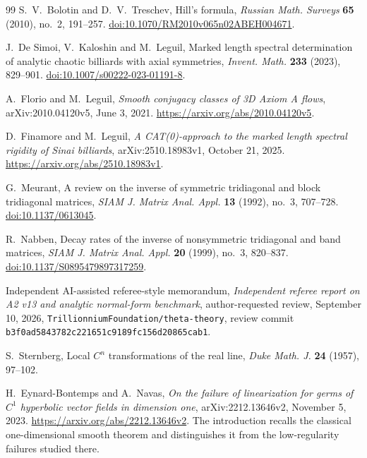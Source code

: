 \begin{thebibliography}{99}
S.~V.~Bolotin and D.~V.~Treschev, Hill's formula,
\emph{Russian Math. Surveys} \textbf{65} (2010), no.~2, 191--257.
\href{https://doi.org/10.1070/RM2010v065n02ABEH004671}{doi:10.1070/RM2010v065n02ABEH004671}.

J.~De Simoi, V.~Kaloshin and M.~Leguil, Marked length spectral
determination of analytic chaotic billiards with axial symmetries,
\emph{Invent. Math.} \textbf{233} (2023), 829--901.
\href{https://doi.org/10.1007/s00222-023-01191-8}{doi:10.1007/s00222-023-01191-8}.

A.~Florio and M.~Leguil, \emph{Smooth conjugacy classes of 3D Axiom A
flows}, arXiv:2010.04120v5, June 3, 2021.
\url{https://arxiv.org/abs/2010.04120v5}.

D.~Finamore and M.~Leguil, \emph{A CAT(0)-approach to the marked
length spectral rigidity of Sinai billiards}, arXiv:2510.18983v1,
October 21, 2025. \url{https://arxiv.org/abs/2510.18983v1}.

G.~Meurant, A review on the inverse of symmetric tridiagonal and
block tridiagonal matrices, \emph{SIAM J. Matrix Anal. Appl.}
\textbf{13} (1992), no.~3, 707--728.
\href{https://doi.org/10.1137/0613045}{doi:10.1137/0613045}.

R.~Nabben, Decay rates of the inverse of nonsymmetric tridiagonal and
band matrices, \emph{SIAM J. Matrix Anal. Appl.} \textbf{20} (1999),
no.~3, 820--837.
\href{https://doi.org/10.1137/S0895479897317259}{doi:10.1137/S0895479897317259}.

Independent AI-assisted referee-style memorandum,
\emph{Independent referee report on A2 v13 and analytic normal-form
benchmark}, author-requested review, September 10, 2026,
\texttt{Trillionnium\allowbreak Foundation/\allowbreak theta-theory},
review commit \texttt{b3f0ad58\allowbreak 43782c22\allowbreak 1651c918\allowbreak 9fc156d2\allowbreak 0865cab1}.

S.~Sternberg, Local $C^n$ transformations of the real line,
\emph{Duke Math. J.} \textbf{24} (1957), 97--102.

H.~Eynard-Bontemps and A.~Navas, \emph{On the failure of linearization
for germs of $C^1$ hyperbolic vector fields in dimension one},
arXiv:2212.13646v2, November 5, 2023.
\url{https://arxiv.org/abs/2212.13646v2}.
The introduction recalls the classical one-dimensional smooth theorem
and distinguishes it from the low-regularity failures studied there.


\end{thebibliography}
